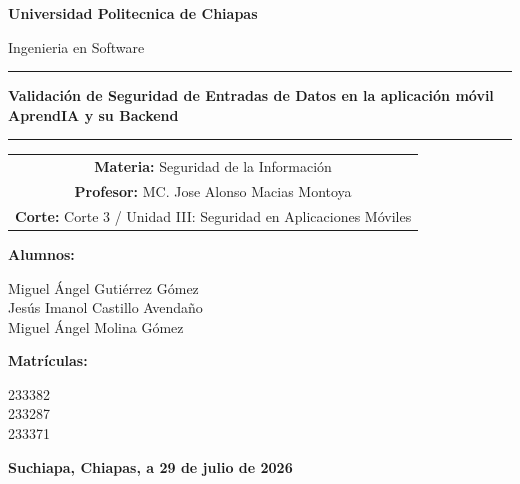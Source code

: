 \documentclass[11pt,a4paper]{article}
\begin{document}

\begin{titlepage}
\centering
\vspace*{2cm}
{\Huge\bfseries Universidad Politecnica de Chiapas\par}
\vspace{0.4cm}
{\Large Ingenieria en Software\par}
\vspace{2cm}

\noindent\rule{\textwidth}{1pt}\par
\vspace{0.3cm}
{\Large\bfseries Validación de Seguridad de Entradas de Datos en la aplicación móvil AprendIA y su Backend\par}
\vspace{0.3cm}
\noindent\rule{\textwidth}{1pt}\par

\vspace{2.5cm}

\begin{tabular}{c}
\textbf{Materia:} Seguridad de la Información \\
\textbf{Profesor:} MC. Jose Alonso Macias Montoya \\
\textbf{Corte:} Corte 3 / Unidad III: Seguridad en Aplicaciones Móviles \\
\end{tabular}

\vspace{2cm}

{\bfseries\large Alumnos:\par}
\vspace{0.3cm}
Miguel Ángel Gutiérrez Gómez \\
Jesús Imanol Castillo Avendaño \\
Miguel Ángel Molina Gómez

\vspace{1cm}

{\bfseries\large Matrículas:\par}
\vspace{0.3cm}
233382 \\
233287 \\
233371

\vfill

{\bfseries Suchiapa, Chiapas, a 29 de julio de 2026}

\end{titlepage}
\end{document}
